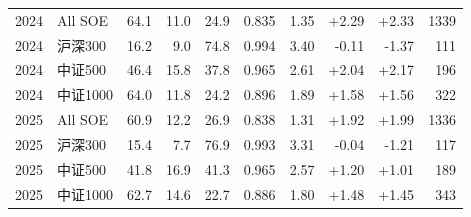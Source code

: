 \documentclass[11pt,a4paper]{ctexart}
\begin{document}
\begin{table}[H]
{\begin{tabular}{llrrrrrrrr}
2024 & All SOE & 64.1 & 11.0 & 24.9 & 0.835 & 1.35 & +2.29 & +2.33 & 1339 \\
2024 & 沪深300 & 16.2 & 9.0 & 74.8 & 0.994 & 3.40 & -0.11 & -1.37 & 111 \\
2024 & 中证500 & 46.4 & 15.8 & 37.8 & 0.965 & 2.61 & +2.04 & +2.17 & 196 \\
2024 & 中证1000 & 64.0 & 11.8 & 24.2 & 0.896 & 1.89 & +1.58 & +1.56 & 322 \\
2025 & All SOE & 60.9 & 12.2 & 26.9 & 0.838 & 1.31 & +1.92 & +1.99 & 1336 \\
2025 & 沪深300 & 15.4 & 7.7 & 76.9 & 0.993 & 3.31 & -0.04 & -1.21 & 117 \\
2025 & 中证500 & 41.8 & 16.9 & 41.3 & 0.965 & 2.57 & +1.20 & +1.01 & 189 \\
2025 & 中证1000 & 62.7 & 14.6 & 22.7 & 0.886 & 1.80 & +1.48 & +1.45 & 343 \\
\bottomrule
\end{tabular}}
\end{table}
\end{document}
